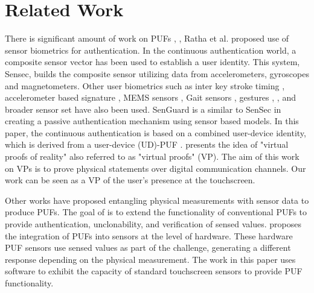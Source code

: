 \documentclass{acm_proc_article-sp}
\begin{document}
\section{Related Work}
\label{sec:related_work}
There is significant amount of work on PUFs \cite{Devadas:2009:PUF}, \cite{PUFIntro}, \cite{Gassend:2002:SPR}
Ratha et al. \cite{Ratha:2001} proposed use of sensor biometrics for authentication.
%
In the continuous authentication world, a composite sensor vector \cite{zhu2013sensec} has been used to establish a user identity. 
This system, Sensec, builds the composite sensor
utilizing data from accelerometers, gyroscopes and magnetometers.
%
Other user biometrics such as inter key stroke timing 
\cite{KeystrokeHASE14},  accelerometer based signature \cite{Liu:2009:UAP}, MEMS sensors
\cite{Aysu:2013:DFL}, Gait sensors \cite{Gait}, gestures \cite{touchscreengestures}, \cite{Gesture14}, and 
broader sensor set \cite{Dey:2013:AHP} have also been
used. 
SenGuard \cite{shi2011senguard} is a similar to SenSec in creating a passive
authentication mechanism using sensor based models. In this paper, the continuous authentication is based on a combined user-device identity,
which is derived from a user-device (UD)-PUF \cite{ScheelTyagi15}.
%
\cite{ruhrmair2015virtual} presents the idea of
"virtual proofs of reality" 
also referred to as "virtual proofs" (VP).
The aim of this work on VPs is
to prove physical statements over digital communication channels.
%
Our work can be seen as
a VP of the user's presence at the touchscreen.

Other works \cite{rosenfeld2010sensor} have proposed 
entangling physical measurements with sensor data
to produce PUFs.
%
The goal of \cite{rosenfeld2010sensor} is to 
extend the functionality of conventional PUFs
to provide authentication, unclonability, and verification of sensed values.
\cite{rosenfeld2010sensor} proposes the integration of PUFs into sensors
at the level of hardware.
These hardware PUF sensors use sensed values as part of the challenge,
generating a different response depending on the physical measurement.
%
The work in this paper uses software to exhibit
the capacity of standard touchscreen sensors to provide PUF functionality.


\end{document}
